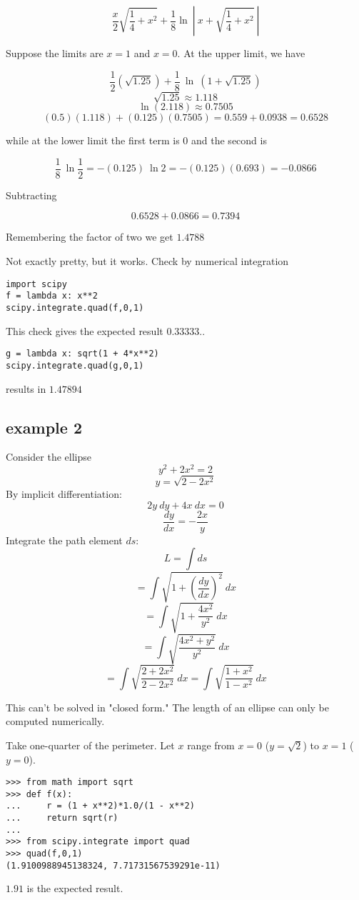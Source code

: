 \documentclass[11pt, oneside]{article}   	%
\begin{document}
\[ \frac{x}{2}\sqrt{\frac{1}{4} + x^2} + \frac{1}{8} \ln \ | \ x + \sqrt{\frac{1}{4} + x^2} \ | \]

Suppose the limits are $x=1$ and $x=0$.  At the upper limit, we have

\[ \frac{1}{2}(\sqrt{1.25}) + \frac{1}{8} \ \ln \ (1 + \sqrt{1.25}) \] 
\[ \sqrt{1.25} \approx 1.118  \]
\[ \ln (2.118) \approx 0.7505 \]
\[ (0.5)(1.118) + (0.125)(0.7505) = 0.559 + 0.0938 = 0.6528 \]

while at the lower limit the first term is $0$ and the second is

\[ \frac{1}{8}\  \ln \frac{1}{2} = - (0.125)\  \ln 2 = - (0.125)(0.693) = -0.0866 \] 

Subtracting

\[ 0.6528 + 0.0866 = 0.7394 \]

Remembering the factor of two we get $1.4788$

Not exactly pretty, but it works.  Check by numerical integration

\begin{verbatim}
import scipy
f = lambda x: x**2
scipy.integrate.quad(f,0,1)
\end{verbatim}
This check gives the expected result $ 0.33333..$

\begin{verbatim}
g = lambda x: sqrt(1 + 4*x**2)
scipy.integrate.quad(g,0,1)
\end{verbatim}
results in $1.47894$

\subsection*{example 2}
Consider the ellipse
\[ y^2 + 2x^2 = 2 \]
\[ y = \sqrt{2 - 2x^2} \]
By implicit differentiation:
\[ 2y \ dy + 4x \ dx = 0 \]
\[ \frac{dy}{dx} = -\frac{2x}{y} \]
 Integrate the path element $ds$:
\[ L = \int ds \]
\[ = \int \sqrt{1 + (\frac{dy}{dx})^2} \ dx \]
\[ = \int \sqrt{1 + \frac{4x^2}{y^2}} \ dx  \]
\[ = \int \sqrt{\frac{4x^2 + y^2}{y^2}} \ dx  \]
\[ = \int \sqrt{\frac{2 + 2x^2}{2 - 2x^2}} \ dx = \int \sqrt{\frac{1 + x^2}{1 - x^2}} \ dx  \]

This can't be solved in "closed form."  The length of an ellipse can only be computed numerically.

Take one-quarter of the perimeter.  Let $x$ range from $x = 0$ ($y = \sqrt{2}$) to $x = 1$ ($y = 0$). 

\begin{verbatim}
>>> from math import sqrt
>>> def f(x):
...     r = (1 + x**2)*1.0/(1 - x**2)
...     return sqrt(r)
... 
>>> from scipy.integrate import quad
>>> quad(f,0,1)
(1.9100988945138324, 7.71731567539291e-11)
\end{verbatim}

$1.91$ is the expected result.
\end{document}
